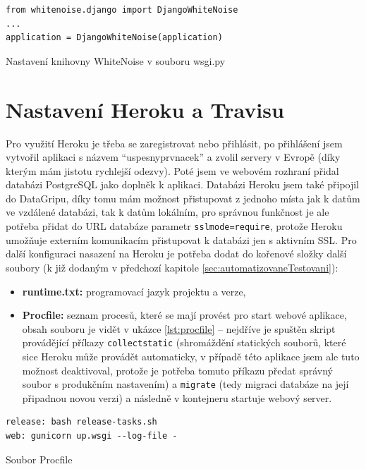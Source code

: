     \begin{listing}[ht]
    	\begin{verbatim}
from whitenoise.django import DjangoWhiteNoise
...
application = DjangoWhiteNoise(application)
    	\end{verbatim}
    	\caption{Nastavení knihovny WhiteNoise v souboru wsgi.py}\label{lst:wsgi}
    \end{listing}
    
    \section{Nastavení Heroku a Travisu}
    Pro využití Heroku je třeba se zaregistrovat nebo přihlásit, po přihlášení jsem vytvořil aplikaci s názvem \enquote{uspesnyprvnacek} a zvolil servery v Evropě (díky kterým mám jistotu rychlejší odezvy). Poté jsem ve webovém rozhraní přidal databázi PostgreSQL jako doplněk k aplikaci. Databázi Heroku jsem také připojil do DataGripu, díky tomu mám možnost přistupovat z jednoho místa jak k datům ve vzdálené databázi, tak k datům lokálním, pro správnou funkčnost je ale potřeba přidat do URL databáze parametr \verb|sslmode=require|, protože Heroku umožňuje externím komunikacím přistupovat k databázi jen s aktivním SSL. Pro další konfiguraci nasazení na Heroku je potřeba dodat do kořenové složky další soubory (k již dodaným v předchozí kapitole \ref{sec:automatizovaneTestovani}):
    \begin{itemize}
        \item \textbf{runtime.txt:} programovací jazyk projektu a verze,
        \item \textbf{Procfile:} seznam procesů, které se mají provést pro start webové aplikace, obsah souboru je vidět v ukázce \ref{lst:procfile} -- nejdříve je spuštěn skript provádějící příkazy \verb|collectstatic| (shromáždění statických souborů, které sice Heroku může provádět automaticky, v případě této aplikace jsem ale tuto možnost deaktivoval, protože je potřeba tomuto příkazu předat správný soubor s produkčním nastavením) a \verb|migrate| (tedy migraci databáze na její připadnou novou verzi) a následně v kontejneru startuje webový server.
    \end{itemize}
    
    \begin{listing}[ht]
    	\begin{verbatim}
release: bash release-tasks.sh
web: gunicorn up.wsgi --log-file -
    	\end{verbatim}
    	\caption{Soubor Procfile}\label{lst:procfile}
    \end{listing}
    
